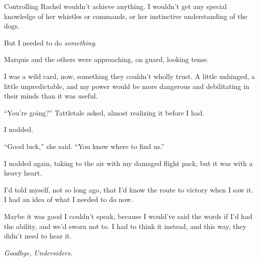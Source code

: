 Controlling Rachel wouldn't achieve anything.  I wouldn't get any special knowledge of her whistles or commands, or her instinctive understanding of the dogs.



But I needed to do \emph{something}.



Marquis and the others were approaching, on guard, looking tense.



I was a wild card, now, something they couldn't wholly trust.  A little unhinged, a little unpredictable, and my power would be more dangerous and debilitating in their minds than it was useful.



``You're going?''  Tattletale asked, almost realizing it before I had.



I nodded.



``Good luck,'' she said.  ``You know where to find us.''



I nodded again, taking to the air with my damaged flight pack, but it was with a heavy heart.



I'd told myself, not so long ago, that I'd know the route to victory when I saw it.  I had an idea of what I needed to do now.



Maybe it was good I couldn't speak, because I would've said the words if I'd had the ability, and we'd sworn not to.  I had to think it instead, and this way, they didn't need to hear it.



\emph{Goodbye, Undersiders.}





